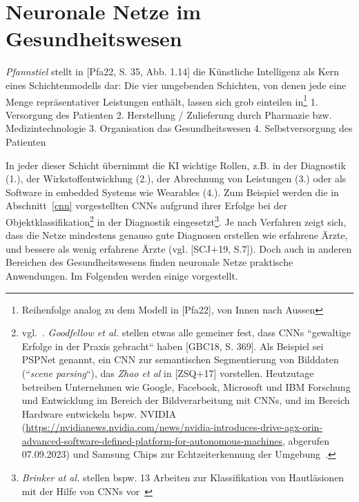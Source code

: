 \chapter{Neuronale Netze im Gesundheitswesen}



\textit{Pfannstiel} stellt in [Pfa22, S. 35, Abb. 1.14] die Künstliche Intelligenz als Kern eines Schichtenmodells dar: Die vier umgebenden Schichten, von denen jede eine Menge repräsentativer Leistungen enthält, lassen sich grob einteilen in\footnote{
    Reihenfolge analog zu dem Modell in [Pfa22], von Innen nach Aussen
}
1. Versorgung des Patienten
2. Herstellung / Zulieferung durch Pharmazie bzw. Medizintechnologie
3. Organisation das Gesundheitswesen
4. Selbstversorgung des Patienten

In jeder dieser Schicht übernimmt die KI wichtige Rollen, z.B. in der Diagnostik (1.), der Wirkstoffentwicklung (2.), der Abrechnung von Leistungen (3.) oder als Software in embedded Systems wie Wearables (4.). Zum Beispiel werden die in Abschnitt~\ref{cnn} vorgestellten CNNs aufgrund ihrer Erfolge bei der Objektklassifikation\footnote{
    vgl.~\cite[330]{Ert21b}. \textit{Goodfellow et al.} stellen etwas alle gemeiner fest, dass CNNs ``gewaltige Erfolge in der Praxis gebracht`` haben [GBC18, S. 369]. Als Beispiel sei PSPNet genannt, ein CNN zur semantischen Segmentierung von Bilddaten (``\textit{scene parsing}``), das \textit{Zhao et al} in [ZSQ+17] vorstellen. Heutzutage betreiben Unternehmen wie Google, Facebook, Microsoft und IBM Forschung und Entwicklung im Bereich der Bildverarbeitung mit CNNs, und im Bereich Hardware entwickeln bspw. NVIDIA (\url{https://nvidianews.nvidia.com/news/nvidia-introduces-drive-agx-orin-advanced-software-defined-platform-for-autonomous-machines}, abgerufen 07.09.2023) und Samsung Chips zur Echtzeiterkennung der Umgebung~\cite[440]{LBH15}.
} in der Diagnostik eingesetzt\footnote{
    \textit{Brinker at al.} stellen bspw. 13 Arbeiten zur Klassifikation von Hautläsionen mit der Hilfe von CNNs vor~\cite{BHU+18}
}. Je nach Verfahren zeigt sich, dass die Netze mindestens genauso gute Diagnosen erstellen wie erfahrene Ärzte, und bessere als wenig erfahrene Ärzte (vgl. [SCJ+19, S.7]). Doch auch in anderen Bereichen des Gesundheitswesens finden neuronale Netze praktische Anwendungen. Im Folgenden werden einige vorgestellt.



